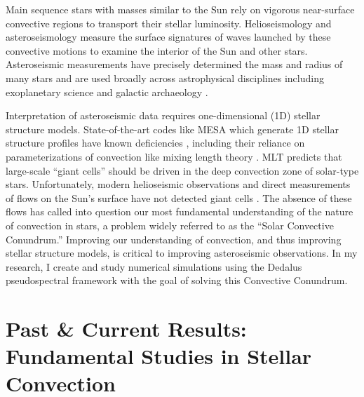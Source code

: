 \documentclass[onecolumn, hmargin=1in, vmargin=1in]{aastex62}
\begin{document}
Main sequence stars with masses similar to the Sun rely on vigorous near-surface convective regions to transport their stellar luminosity.
Helioseismology and asteroseismology measure the surface signatures of waves launched by these convective motions to examine the interior of the Sun and other stars.
Asteroseismic measurements have precisely determined the mass and radius of many stars and are used broadly across astrophysical disciplines including exoplanetary science and galactic archaeology \citep{huber&all2019}.

Interpretation of asteroseismic data requires one-dimensional (1D) stellar structure models. 
State-of-the-art codes like MESA \citep{paxton&all2011} which generate 1D stellar structure profiles have known deficiencies \citep{buldgen2019}, including their reliance on parameterizations of convection like mixing length theory \citep[MLT,][]{bohm-vitense1958}.
MLT predicts that large-scale ``giant cells'' should be driven in the deep convection zone of solar-type stars.
Unfortunately, modern helioseismic observations and direct measurements of flows on the Sun's surface have not detected giant cells \citep{hanasoge&all2015, hathaway&all2015}.
The absence of these flows has called into question our most fundamental understanding of the nature of convection in stars, a problem widely referred to as the ``Solar Convective Conundrum.''
Improving our understanding of convection, and thus improving stellar structure models, is critical to improving asteroseismic observations.
In my research, I create and study numerical simulations using the Dedalus pseudospectral framework \citep{burns&all2019} with the goal of solving this Convective Conundrum.

\vspace{-44pt}
\section*{\textbf{Past \& Current Results: Fundamental Studies in Stellar Convection}}
\thispagestyle{fancy}
\end{document}
